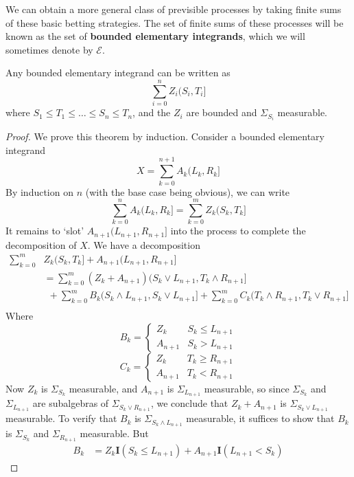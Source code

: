 We can obtain a more general class of previsible processes by taking finite sums of these basic betting strategies. The set of finite sums of these processes will be known as the set of {\bf bounded elementary integrands}, which we will sometimes denote by $\mathcal{E}$.

\begin{lemma}
    Any bounded elementary integrand can be written as
    \[ \sum_{i = 0}^n Z_i(S_i,T_i] \]
    where $S_1 \leq T_1 \leq \dots \leq S_n \leq T_n$, and the $Z_i$ are bounded and $\Sigma_{S_i}$ measurable.
\end{lemma}
\begin{proof}
    We prove this theorem by induction. Consider a bounded elementary integrand
    \[ X = \sum_{k = 0}^{n+1} A_k(L_k,R_k] \]
    By induction on $n$ (with the base case being obvious), we can write
    \[ \sum_{k = 0}^n A_k(L_k,R_k] = \sum_{k = 0}^m Z_k(S_k,T_k] \]
    It remains to `slot' $A_{n+1}(L_{n+1},R_{n+1}]$ into the process to complete the decomposition of $X$. We have a decomposition
    \begin{align*}
        \sum_{k = 0}^m & Z_k(S_k,T_k] + A_{n+1}(L_{n+1},R_{n+1}]\\
            &= \sum_{k = 0}^m (Z_k + A_{n+1}) (S_k \vee L_{n+1}, T_k \wedge R_{n+1}]\\
        &\ \ + \sum_{k = 0}^m B_k (S_k \wedge L_{n+1}, S_k \vee L_{n+1}] + \sum_{k = 0}^m C_k (T_k \wedge R_{n+1}, T_k \vee R_{n+1}]\\
    \end{align*}
    Where
    \[ B_k = \begin{cases} Z_k & S_k \leq L_{n+1} \\ A_{n+1} & S_k > L_{n+1} \end{cases} \]
    \[ C_k = \begin{cases} Z_k & T_k \geq R_{n+1} \\ A_{n+1} & T_k < R_{n+1} \end{cases} \]
    Now $Z_k$ is $\Sigma_{S_k}$ measurable, and $A_{n+1}$ is $\Sigma_{L_{n+1}}$ measurable, so since $\Sigma_{S_k}$ and $\Sigma_{L_{n+1}}$ are subalgebras of $\Sigma_{S_k \vee R_{n+1}}$, we conclude that $Z_k + A_{n+1}$ is $\Sigma_{S_k \vee L_{n+1}}$ measurable. To verify that $B_k$ is $\Sigma_{S_k \wedge L_{n+1}}$ measurable, it suffices to show that $B_k$ is $\Sigma_{S_k}$ and $\Sigma_{R_{n+1}}$ measurable. But
    \begin{align*}
        B_k &= Z_k \mathbf{I}(S_k \leq L_{n+1}) + A_{n+1} \mathbf{I}(L_{n+1} < S_k)

\end{align*}
\end{proof}
